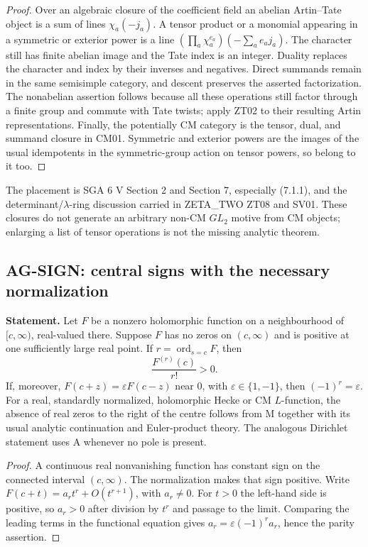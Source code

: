 \documentclass[11pt,a4paper]{article}
\begin{document}
\begin{proof}
Over an algebraic closure of the coefficient field an abelian Artin--Tate
object is a sum of lines $\chi_a(-j_a)$. A tensor product or a monomial
appearing in a symmetric or exterior power is a line
$(\prod_a\chi_a^{e_a})(-\sum_a e_aj_a)$. The character still has finite
abelian image and the Tate index is an integer. Duality replaces the
character and index by their inverses and negatives. Direct summands remain
in the same semisimple category, and descent preserves the asserted
factorization. The nonabelian assertion follows because all these
operations still factor through a finite group and commute with Tate
twists; apply ZT02 to their resulting Artin representations. Finally, the
potentially CM category is the tensor, dual, and summand closure in CM01.
Symmetric and exterior powers are the images of the usual idempotents in
the symmetric-group action on tensor powers, so belong to it too.
\end{proof}

The placement is SGA 6 V Section 2 and Section 7, especially (7.1.1),
and the determinant/$\lambda$-ring discussion carried in ZETA\_TWO ZT08
and SV01. These closures do not generate an arbitrary non-CM $GL_2$
motive from CM objects; enlarging a list of tensor operations is not the
missing analytic theorem.

\subsection{AG-SIGN: central signs with the necessary normalization}
\label{ag:sign}

\textbf{Statement.} Let $F$ be a nonzero holomorphic function on a
neighbourhood of $[c,\infty)$, real-valued there. Suppose $F$ has no zeros
on $(c,\infty)$ and is positive at one sufficiently large real point.
If $r=\operatorname{ord}_{s=c}F$, then
\[
 \frac{F^{(r)}(c)}{r!}>0.
\]
If, moreover, $F(c+z)=\varepsilon F(c-z)$ near $0$, with
$\varepsilon\in\{1,-1\}$, then $(-1)^r=\varepsilon$.
For a real, standardly normalized, holomorphic Hecke or CM $L$-function,
the absence of real zeros to the right of the centre follows from M
together with its usual analytic continuation and Euler-product theory.
The analogous Dirichlet statement uses A whenever no pole is present.

\begin{proof}
A continuous real nonvanishing function has constant sign on the connected
interval $(c,\infty)$. The normalization makes that sign positive.
Write $F(c+t)=a_rt^r+O(t^{r+1})$, with $a_r\ne0$. For $t>0$ the
left-hand side is positive, so $a_r>0$ after division by $t^r$ and passage
to the limit. Comparing the leading terms in the functional equation gives
$a_r=\varepsilon(-1)^r a_r$, hence the parity assertion.
\end{proof}
\end{document}
